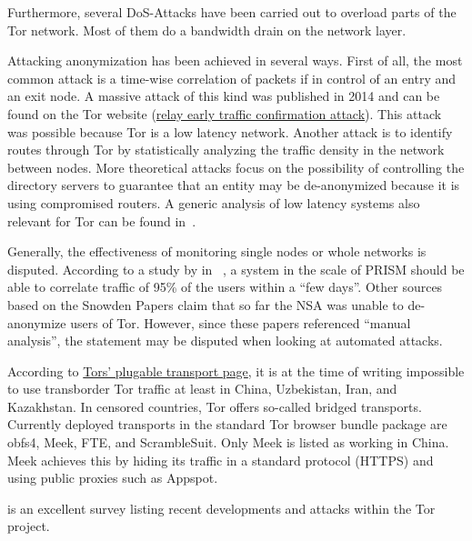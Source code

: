 Furthermore, several DoS-Attacks have been carried out to overload parts of the Tor network. Most of them do a bandwidth drain on the network layer.

Attacking anonymization has been achieved in several ways. First of all, the most common attack is a time-wise correlation of packets if in control of an entry and an exit node. A massive attack of this kind was published in 2014 and can be found on the Tor website (\href{https://blog.torproject.org/blog/tor-security-advisory-relay-early-traffic-confirmation-attack}{relay early traffic confirmation attack}). This attack was possible because Tor is a low latency network. Another attack is to identify routes through Tor by statistically analyzing the traffic density in the network between nodes. More theoretical attacks focus on the possibility of controlling the directory servers to guarantee that an entity may be de-anonymized because it is using compromised routers. A generic analysis of low latency systems also relevant for Tor can be found in~\cite{johnson2009design}.

Generally, the effectiveness of monitoring single nodes or whole networks is disputed. According to a study by \citeauthor{ccs2013-usersrouted} in \citeyear{ccs2013-usersrouted}~\cite{ccs2013-usersrouted}, a system in the scale of PRISM should be able to correlate traffic of 95\% of the users within a ``few days''. Other sources based on the Snowden Papers claim that so far the NSA was unable to de-anonymize users of  Tor. However, since these papers referenced ``manual analysis'', the statement may be disputed when looking at automated attacks.

According to \href{https://www.torproject.org/docs/pluggable-transports}{Tors' plugable transport page}, it is at the time of writing impossible to use transborder Tor traffic at least in China, Uzbekistan, Iran, and Kazakhstan. In censored countries, Tor offers so-called bridged transports. Currently deployed transports in the standard Tor browser bundle package are obfs4, Meek, FTE, and ScrambleSuit. Only Meek is listed as working in China. Meek achieves this by hiding its traffic in a standard protocol (HTTPS) and using public proxies such as Appspot.

\cite{saleh2018shedding} is an excellent survey listing recent developments and attacks within the Tor project.

